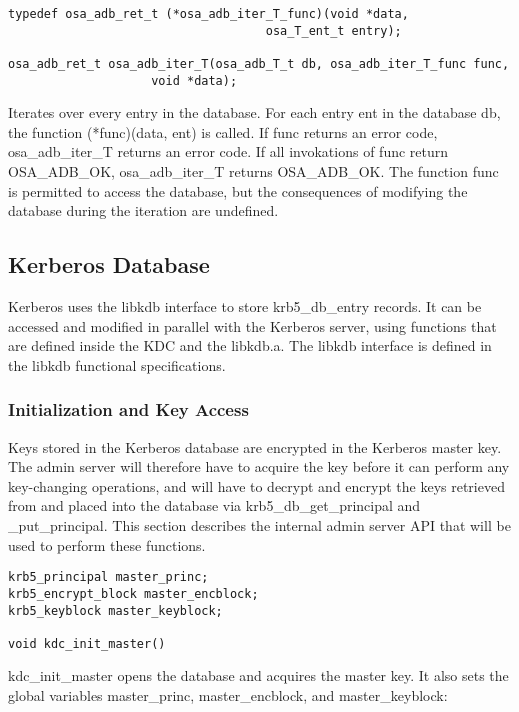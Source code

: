 \begin{verbatim}
typedef osa_adb_ret_t (*osa_adb_iter_T_func)(void *data,
                                    osa_T_ent_t entry);

osa_adb_ret_t osa_adb_iter_T(osa_adb_T_t db, osa_adb_iter_T_func func, 
                    void *data);
\end{verbatim}

Iterates over every entry in the database.  For each entry ent in the
database db, the function (*func)(data, ent) is called.  If func
returns an error code, osa_adb_iter_T returns an error code.  If all
invokations of func return OSA_ADB_OK, osa_adb_iter_T returns
OSA_ADB_OK.  The function func is permitted to access the database,
but the consequences of modifying the database during the iteration
are undefined.

\subsection{Kerberos Database}

Kerberos uses the libkdb interface to store krb5_db_entry records.  It
can be accessed and modified in parallel with the Kerberos server,
using functions that are defined inside the KDC and the libkdb.a.  The
libkdb interface is defined in the libkdb functional specifications.

\subsubsection{Initialization and Key Access}

Keys stored in the Kerberos database are encrypted in the Kerberos
master key.  The admin server will therefore have to acquire the key
before it can perform any key-changing operations, and will have to
decrypt and encrypt the keys retrieved from and placed into the
database via krb5_db_get_principal and _put_principal.  This section
describes the internal admin server API that will be used to perform
these functions.

\begin{verbatim}
krb5_principal master_princ;
krb5_encrypt_block master_encblock;
krb5_keyblock master_keyblock;

void kdc_init_master()
\end{verbatim}

kdc_init_master opens the database and acquires the master key.  It
also sets the global variables master_princ, master_encblock, and
master_keyblock:

